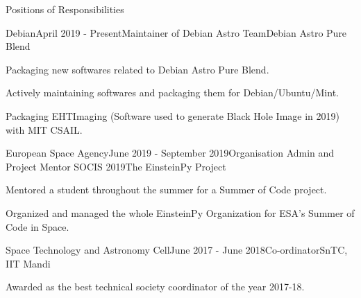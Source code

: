 \documentclass{resume} %
\begin{document}
\begin{rSection}{Positions of Responsibilities}


\begin{rSubsection}{Debian}{April 2019 - Present}{Maintainer of Debian Astro Team}{Debian Astro Pure Blend}
\item Packaging new softwares related to Debian Astro Pure Blend.
\item Actively maintaining softwares  and packaging them for Debian/Ubuntu/Mint.
\item Packaging EHTImaging (Software used to generate Black Hole Image in 2019) with MIT CSAIL.
\end{rSubsection}

\begin{rSubsection}{European Space Agency}{June 2019 - September 2019}{Organisation Admin and Project Mentor SOCIS 2019}{The EinsteinPy Project}
\item Mentored a student throughout the summer for a Summer of Code project.
\item Organized and managed the whole EinsteinPy Organization for ESA's Summer of Code in Space.
 \end{rSubsection}

\begin{rSubsection}{Space Technology and Astronomy Cell}{June 2017 - June 2018}{Co-ordinator}{SnTC, IIT Mandi}
\item Awarded as the best technical society coordinator of the year 2017-18. 
 \end{rSubsection}
\end{rSection}





\end{document}

